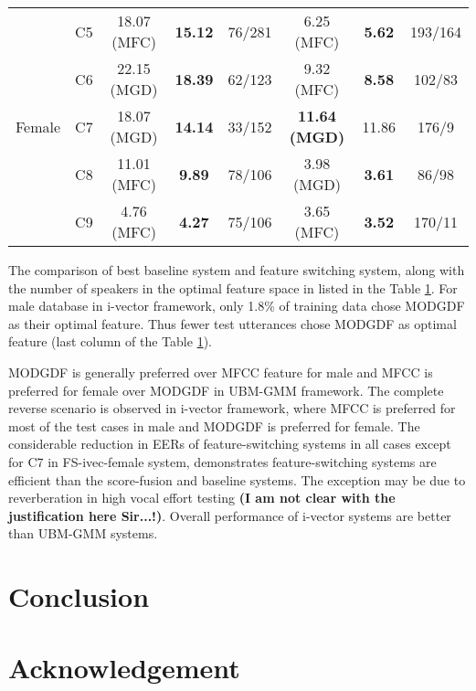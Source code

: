 \documentclass{article}
\begin{document}
\begin{table}[h!tb]
{\begin{tabular}{cc|c|c|c|c|c|c|}
\multicolumn{1}{|c|}{\multirow{5}{*}{Female}} & C5 & 18.07 (MFC) & {\bf 15.12} & 76/281 & 6.25 (MFC) & {\bf 5.62} & 193/164 \\ \cline{2-8} 
\multicolumn{1}{|c|}{} & C6 & 22.15 (MGD) & {\bf 18.39} & 62/123 & 9.32 (MFC) & {\bf 8.58} & 102/83 \\ \cline{2-8} 
\multicolumn{1}{|c|}{} & C7 & 18.07 (MGD) & {\bf 14.14} & 33/152 & {\bf 11.64 (MGD)} & 11.86 & 176/9 \\ \cline{2-8} 
\multicolumn{1}{|c|}{} & C8 & 11.01 (MFC) & {\bf 9.89} & 78/106 & 3.98 (MGD) & {\bf 3.61} & 86/98 \\ \cline{2-8} 
\multicolumn{1}{|c|}{} & C9 & 4.76 (MFC) & {\bf 4.27} & 75/106 & 3.65 (MFC) & {\bf 3.52} & 170/11 \\ \hline
\end{tabular}
}
\label{tab:ubm-spkrCount}
\end{table}

\vspace{0.25cm}
The comparison of best baseline system and feature switching system, along with the number of speakers in the optimal feature space in listed in the Table \ref{tab:ubm-spkrCount}. For male database in i-vector framework, only 1.8\% of training data chose MODGDF as their optimal feature. Thus fewer test utterances chose MODGDF as optimal feature (last column of the Table \ref{tab:ubm-spkrCount}). 

\vspace{0.25cm}
MODGDF is generally preferred over MFCC feature for male and MFCC is preferred for female over MODGDF in UBM-GMM framework. The complete reverse scenario is observed in i-vector framework, where MFCC is preferred for most of the test cases in male and MODGDF is preferred for female. The considerable reduction in EERs of feature-switching systems in all cases except for C7 in FS-ivec-female system, demonstrates feature-switching systems are efficient than the score-fusion and baseline systems. The exception may be due to reverberation in high vocal effort testing \cite{vocalEffort} {\bf (I am not clear with the justification here Sir...!)}. Overall performance of i-vector systems are better than UBM-GMM systems.  

\vspace{0.25cm}
\section{Conclusion}
\label{sec:conclude}

\vspace{0.25cm}
\section{Acknowledgement}
\label{sec:ack}


\clearpage 



\end{document}
